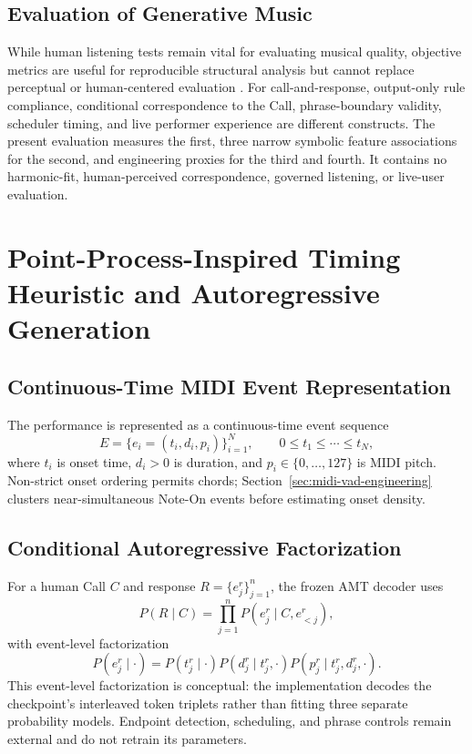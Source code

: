 \documentclass[11pt,a4paper]{article}
\begin{document}
\subsection{Evaluation of Generative Music}

While human listening tests remain vital for evaluating musical quality, objective metrics are useful for reproducible structural analysis but cannot replace perceptual or human-centered evaluation \citep{ji2023survey,lerch2025evaluation}. For call-and-response, output-only rule compliance, conditional correspondence to the Call, phrase-boundary validity, scheduler timing, and live performer experience are different constructs. The present evaluation measures the first, three narrow symbolic feature associations for the second, and engineering proxies for the third and fourth. It contains no harmonic-fit, human-perceived correspondence, governed listening, or live-user evaluation.

\section{Point-Process-Inspired Timing Heuristic and Autoregressive Generation}
\label{sec:temporal-modeling}

\subsection{Continuous-Time MIDI Event Representation}

The performance is represented as a continuous-time event sequence
\begin{equation}
E=\{e_i=(t_i,d_i,p_i)\}_{i=1}^{N},\qquad
0\leq t_1\leq\cdots\leq t_N,
\end{equation}
where $t_i$ is onset time, $d_i>0$ is duration, and $p_i\in\{0,\ldots,127\}$ is MIDI pitch. Non-strict onset ordering permits chords; Section~\ref{sec:midi-vad-engineering} clusters near-simultaneous Note-On events before estimating onset density.

\subsection{Conditional Autoregressive Factorization}

For a human Call $C$ and response $R=\{e_j^r\}_{j=1}^{n}$, the frozen AMT decoder uses
\begin{equation}
P(R\mid C)=\prod_{j=1}^{n}P(e_j^r\mid C,e_{<j}^r),
\end{equation}
with event-level factorization
\begin{equation}
P(e_j^r\mid\cdot)=P(t_j^r\mid\cdot)
P(d_j^r\mid t_j^r,\cdot)
P(p_j^r\mid t_j^r,d_j^r,\cdot).
\end{equation}
This event-level factorization is conceptual: the implementation decodes the checkpoint's interleaved token triplets rather than fitting three separate probability models. Endpoint detection, scheduling, and phrase controls remain external and do not retrain its parameters.
\end{document}
